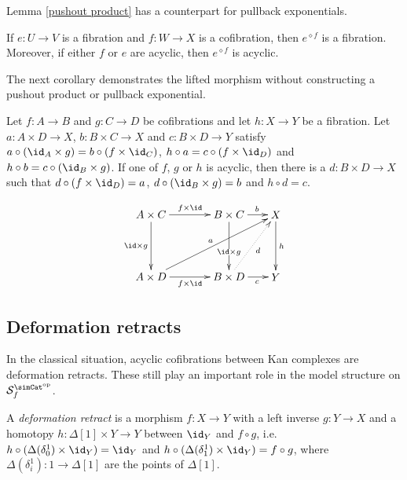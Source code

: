\documentclass{tac}
\newcommand\hide[1]{}
\newcommand\cat\mathcal
\newcommand\dual{^{\mathrm{op}}}
\newcommand\s{^{\simCat\dual}}
\newcommand\of{:}
\newcommand\simplex\Delta
\newcommand\f{_f}
\newcommand\pe[1]{^{\diamond #1}}
\begin{document}
Lemma \ref{pushout product} has a counterpart for pullback exponentials.

\begin{corollary} If $e\of U\to V$ is a fibration and $f\of W\to X$ is a cofibration, then $e\pe f$ is a fibration. Moreover, if either $f$ or $e$ are acyclic, then $e\pe f$ is acyclic. \label{pullback exponential}
\end{corollary}

The next corollary demonstrates the lifted morphism without constructing a pushout product or pullback exponential.

\begin{corollary} Let $f\of A\to B$ and $g\of C\to D$ be cofibrations and let $h\of X\to Y$ be a fibration. Let $a\of A\times D\to X$, $b\of B\times C\to X$ and $c\of B \times D\to Y$ satisfy $a\circ(\id_A\times g) = b\circ(f\times \id_C)$, $h\circ a=c\circ(f\times \id_D)$ and $h\circ b=c\circ(\id_B\times g)$. If one of $f$, $g$ or $h$ is acyclic, then there is a $d\of B\times D\to X$ such that $d\circ(f\times\id_D)=a$, $d\circ(\id_B\times g)=b$ and $h\circ d = c$.
\hide{\[\xymatrix{
A\times C\ar[r]^{f\times \id}\ar[d]_{\id\times g} & B\times C\ar[r]^b\ar[d]_(.3){\id\times g} & X\ar[d]^h\\
A\times D\ar[r]_{f\times \id} \ar[urr]^(.3){a} & B\times D \ar[r]_c \ar@{.>}[ur]_{d} & Y
}\]}
\[\xy
(0,20)*+{A\times C}="AC",(25,20)*+{B\times C}="BC",(40,20)*+{X}="X",
(0,0)*+{A\times D}="AD",(25,0)*+{B\times D}="BD",(40,0)*+{Y}="Y"
\ar^{f\times\id} "AC";"BC"
\ar_{\id\times g} "AC";"AD"
\ar_{f\times\id} "AD";"BD"
\ar^{a} "AD";"X"
\ar|(.6){\id\times g} "BC";"BD"
\ar^(.6){b} "BC";"X"
\ar@{.>}_{d} "BD";"X"
\ar_(.6){c} "BD";"Y"
\ar^{h} "X";"Y"
\endxy\]

\hide{Transposed view:
\[\xymatrix{
A\ar[r]^{a^t}\ar[d]_f & X^D\ar[r]^{X^g}\ar[d]^(.7){h^D} & X^C\ar[d]^{h^C}\\
B\ar[r]_{c^t} \ar[urr]_(.7){b^t} \ar@{.>}[ur]^{d^t} & Y^D \ar[r]_{Y^g} & Y^C
}\]}\label{triple lift}
\end{corollary}


\subsection{Deformation retracts}
In the classical situation, acyclic cofibrations between Kan complexes are deformation retracts. These still play an important role in the model structure on $\cat S\s\f$.

\begin{definition} A \emph{deformation retract} is a morphism $f\of X\to Y$ with a left inverse $g\of Y\to X$ and a homotopy $h\of \simplex[1]\times Y\to Y$ between $\id_Y$ and $f\circ g$, i.e.\ $h\circ (\Delta(\delta^1_0)\times \id_Y) = \id_Y$ and $h\circ (\Delta(\delta^1_1)\times \id_Y) = f\circ g$, where $\Delta(\delta^1_i)\of 1\to \simplex[1]$ are the points of $\simplex[1]$.
\end{definition}
\end{document}
